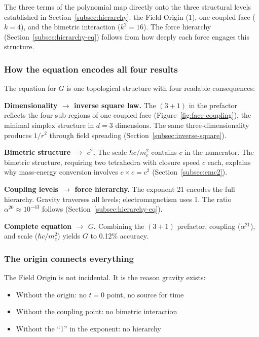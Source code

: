\documentclass[aps,prd,preprint,superscriptaddress,showpacs,preprintnumbers,amsmath,amssymb,nofootinbib]{revtex4-2}
\begin{document}
The three terms of the polynomial map directly onto the three structural levels established in Section~\ref{subsec:hierarchy}: the Field Origin ($1$), one coupled face ($k = 4$), and the bimetric interaction ($k^2 = 16$). The force hierarchy (Section~\ref{subsec:hierarchy-eq}) follows from how deeply each force engages this structure.

\subsubsection*{How the equation encodes all four results}

The equation for $G$ is one topological structure with four readable consequences:

\textbf{Dimensionality $\rightarrow$ inverse square law.} The $(3+1)$ in the prefactor reflects the four sub-regions of one coupled face (Figure~\ref{fig:face-coupling}), the minimal simplex structure in $d = 3$ dimensions. The same three-dimensionality produces $1/r^2$ through field spreading (Section~\ref{subsec:inverse-square}).

\textbf{Bimetric structure $\rightarrow$ $c^2$.} The scale $\hbar c/m_e^2$ contains $c$ in the numerator. The bimetric structure, requiring two tetrahedra with closure speed $c$ each, explains why mass-energy conversion involves $c \times c = c^2$ (Section~\ref{subsec:emc2}).

\textbf{Coupling levels $\rightarrow$ force hierarchy.} The exponent 21 encodes the full hierarchy. Gravity traverses all levels; electromagnetism uses 1. The ratio $\alpha^{20} \approx 10^{-43}$ follows (Section~\ref{subsec:hierarchy-eq}).

\textbf{Complete equation $\rightarrow$ $G$.} Combining the $(3+1)$ prefactor, coupling ($\alpha^{21}$), and scale ($\hbar c/m_e^2$) yields $G$ to 0.12\% accuracy.

\subsubsection*{The origin connects everything}

The Field Origin is not incidental. It is the reason gravity exists:
\begin{itemize}
\item Without the origin: no $t = 0$ point, no source for time
\item Without the coupling point: no bimetric interaction
\item Without the ``1'' in the exponent: no hierarchy
\end{itemize}
\end{document}
